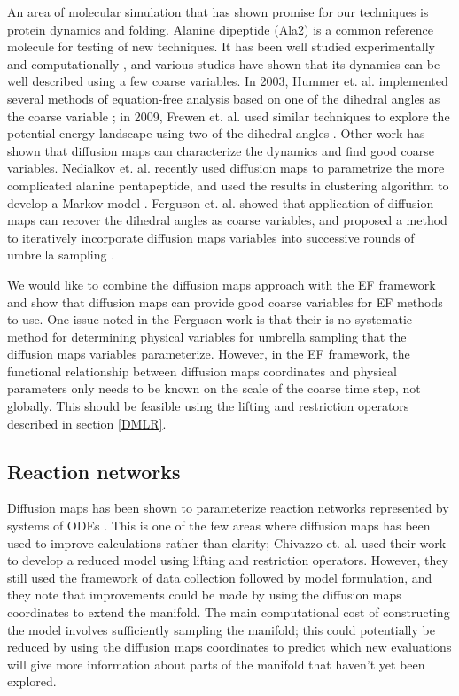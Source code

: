 \documentclass[12pt]{article}
\begin{document}
An area of molecular simulation that has shown promise for our techniques is protein dynamics and folding. Alanine dipeptide (Ala2) is a common reference molecule for testing of new techniques. It has been well studied experimentally and computationally \cite{Wang2014}, and various studies have shown that its dynamics can be well described using a few coarse variables. In 2003, Hummer et. al. implemented several methods of equation-free analysis based on one of the dihedral angles as the coarse variable \cite{Hummer2003}; in 2009, Frewen et. al. used similar techniques to explore the potential energy landscape using two of the dihedral angles \cite{Frewen2009}. Other work has shown that diffusion maps can characterize the dynamics and find good coarse variables. Nedialkov et. al. recently used diffusion maps to parametrize the more complicated alanine pentapeptide, and used the results in clustering algorithm to develop a Markov model \cite{Nedialkova2014}. Ferguson et. al. showed that application of diffusion maps can recover the dihedral angles as coarse variables, and proposed a method to iteratively incorporate diffusion maps variables into successive rounds of umbrella sampling \cite{Ferguson2011}. \vspace{1mm}

We would like to combine the diffusion maps approach with the EF framework and show that diffusion maps can provide good coarse variables for EF methods to use. One issue noted in the Ferguson work is that their is no systematic method for determining physical variables for umbrella sampling that the diffusion maps variables parameterize. However, in the EF framework, the functional relationship between diffusion maps coordinates and physical parameters only needs to be known on the scale of the coarse time step, not globally. This should be feasible using the lifting and restriction operators described in section \ref{DMLR}.

\subsection{Reaction networks}

Diffusion maps has been shown to parameterize reaction networks represented by systems of ODEs \cite{Chiavazzo2014}. This is one of the few areas where diffusion maps has been used to improve calculations rather than clarity; Chivazzo et. al. used their work to develop a reduced model using lifting and restriction operators. However, they still used the framework of data collection followed by model formulation, and they note that improvements could be made by using the diffusion maps coordinates to extend the manifold. The main computational cost of constructing the model involves sufficiently sampling the manifold; this could potentially be reduced by using the diffusion maps coordinates to predict which new evaluations will give more information about parts of the manifold that haven't yet been explored. \vspace{1mm}
\end{document}
